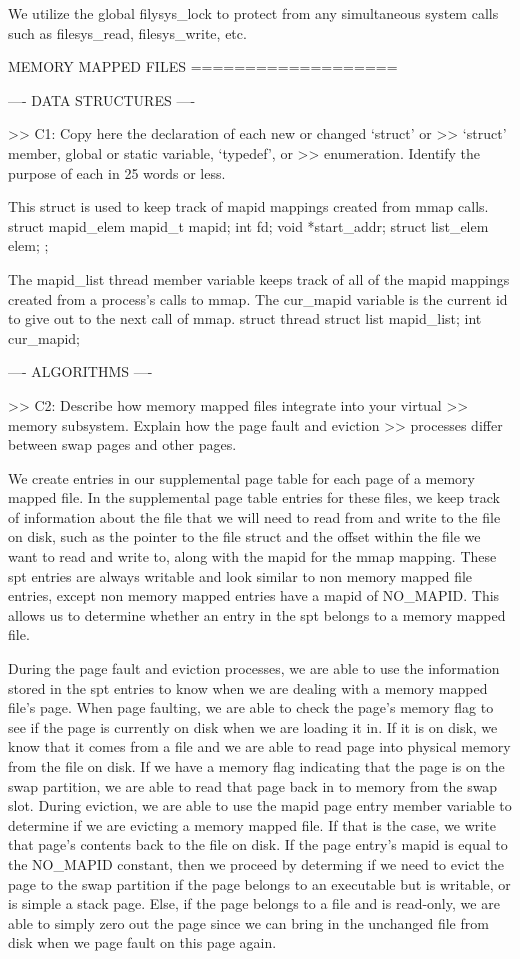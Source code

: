 We utilize the global filysys_lock to protect from any simultaneous system
calls such as filesys_read, filesys_write, etc. 

             MEMORY MAPPED FILES
             ===================

---- DATA STRUCTURES ----

>> C1: Copy here the declaration of each new or changed `struct' or
>> `struct' member, global or static variable, `typedef', or
>> enumeration.  Identify the purpose of each in 25 words or less.

This struct is used to keep track of mapid mappings created from mmap calls.
    struct mapid_elem
    {
        mapid_t mapid;
        int fd;
        void *start_addr;
        struct list_elem elem;
    };

The mapid_list thread member variable keeps track of all of the mapid mappings
created from a process's calls to mmap. The cur_mapid variable is the current
id to give out to the next call of mmap.
    struct thread
    {
       struct list mapid_list; 
       int cur_mapid; 
    }

---- ALGORITHMS ----

>> C2: Describe how memory mapped files integrate into your virtual
>> memory subsystem.  Explain how the page fault and eviction
>> processes differ between swap pages and other pages.

We create entries in our supplemental page table for each page of a memory
mapped file. In the supplemental page table entries for these files,
we keep track of information about the file that we will need to
read from and write to the file on disk, such as the pointer to the file
struct and the offset within the file we want to read and write to, along
with the mapid for the mmap mapping. These spt entries are always writable
and look similar to non memory mapped file entries, except non memory mapped
entries have a mapid of NO_MAPID. This allows us to determine whether an 
entry in the spt belongs to a memory mapped file.

During the page fault and eviction processes, we are able to use the
information stored in the spt entries to know when we are dealing with
a memory mapped file's page. When page faulting, we are able to check the
page's memory flag to see if the page is currently on disk when we are
loading it in. If it is on disk, we know that it comes from a file and we
are able to read page into physical memory from the file on disk. If we
have a memory flag indicating that the page is on the swap partition, we
are able to read that page back in to memory from the swap slot. During 
eviction, we are able to use the mapid page entry member variable to
determine if we are evicting a memory mapped file. If that is the case,
we write that page's contents back to the file on disk. If the page entry's
mapid is equal to the NO_MAPID constant, then we proceed by determing if
we need to evict the page to the swap partition if the page belongs to an
executable but is writable, or is simple a stack page. Else, if the page
belongs to a file and is read-only, we are able to simply zero out the page
since we can bring in the unchanged file from disk when we page fault on
this page again.


